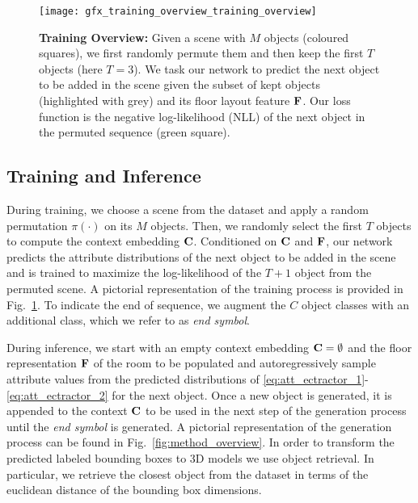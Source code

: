 \documentclass{article}
\newcommand{\figref}[1]{Fig.~\ref{#1}}
\begin{document}
\begin{figure*}
    \centering
    \texttt{[image: gfx\_training\_overview\_training\_overview]}
    \caption{\small
        \textbf{Training Overview:} Given a scene with $M$ objects (coloured
        squares), we first randomly permute them and then keep the first $T$
        objects (here $T=3$). We task our network to predict
        the next object to be added in the scene given the subset of kept objects
        (highlighted with grey) and its floor layout feature
        $\mathbf{F}$. Our loss function is the negative log-likelihood
        (NLL) of the next object in the permuted sequence (green square).
    }
    \label{fig:training_overview}
    \vspace{-1.2em}
\end{figure*}



\vspace{-2mm}
\subsection{Training and Inference}\label{subsec:training_inference}

During training, we choose a scene from the dataset and apply a random
permutation $\pi(\cdot)$ on its $M$ objects. Then, we randomly select the first
$T$ objects to compute the context embedding $\mathbf{C}$. Conditioned on $\mathbf{C}$ and
$\mathbf{F}$, our network predicts the attribute distributions of the
next object to be added in the scene and is trained to maximize the
log-likelihood of the $T+1$ object from the permuted scene. A pictorial
representation of the training process is provided in
\figref{fig:training_overview}. To indicate the end of sequence, we
augment the $C$ object classes with an additional class, which we refer to as
\emph{end symbol}.

During inference, we start with an empty context embedding $\mathbf{C}=\emptyset$ and
the floor representation $\mathbf{F}$ of the room to be populated and autoregressively
sample attribute values from the predicted distributions of
\eqref{eq:att_ectractor_1}-\eqref{eq:att_ectractor_2} for the next object.
Once a new object is
generated, it is appended to the context $\mathbf{C}$ to be used in the next
step of the generation process until the \emph{end symbol} is generated.  A
pictorial representation of the generation process can be found in
\figref{fig:method_overview}. In order to transform the predicted
labeled bounding boxes to 3D models we use object retrieval. In particular, we
retrieve the closest object from the dataset in terms of the euclidean distance
of the bounding box dimensions.
\end{document}
